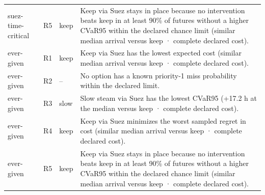 \begin{tabular}{llll}
suez-time-critical & R5 & keep & Keep via Suez stays in place because no intervention beats keep in at least 90\% of futures without a higher CVaR95 within the declared chance limit (similar median arrival versus keep · complete declared cost). \\
ever-given & R1 & keep & Keep via Suez has the lowest expected cost (similar median arrival versus keep · complete declared cost). \\
ever-given & R2 & -- & No option has a known priority-1 miss probability within the declared limit. \\
ever-given & R3 & slow & Slow steam via Suez has the lowest CVaR95 (+17.2 h at the median versus keep · complete declared cost). \\
ever-given & R4 & keep & Keep via Suez minimizes the worst sampled regret in cost (similar median arrival versus keep · complete declared cost). \\
ever-given & R5 & keep & Keep via Suez stays in place because no intervention beats keep in at least 90\% of futures without a higher CVaR95 within the declared chance limit (similar median arrival versus keep · complete declared cost). \\
\bottomrule
\end{tabular}
